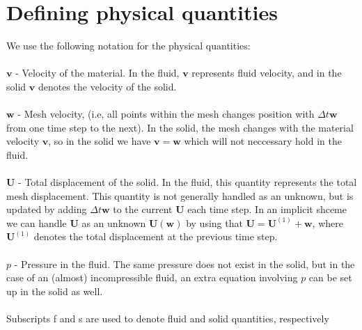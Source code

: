 \documentclass{article}
\begin{document}
\section{Defining physical quantities}
We use the following notation for the physical quantities: \\
\\
$\mathbf{v}$ - Velocity of the material. In the fluid, $\mathbf{v}$ represents fluid velocity, and in the solid $\mathbf{v}$ denotes the velocity of the solid. 
\\ \\
$\mathbf{w}$ - Mesh velocity, (i.e, all points within the mesh changes position with $\Delta t \mathbf{w}$ from one time step to the next). In the solid, the mesh changes with the material velocity $\mathbf{v}$, so in the solid we have $\mathbf{v} = \mathbf{w}$ which will not neccessary hold in the fluid.
\\
\\
$ \mathbf{U}$ - Total displacement of the solid. In the fluid, this quantity represents the total mesh displacement. This quantity is not generally handled as an unknown, but is updated by adding $\Delta t \mathbf{w}$ to the current $\mathbf{U}$ each time step. In an implicit shceme we can handle $\mathbf{U}$ as an unknown $\mathbf{U(w)}$ by using that $\mathbf{U} = \mathbf{U}^{(1)} + \mathbf{w}$, where $\mathbf{U}^{(1)}$ denotes the total displacement at the previous time step. 
\\
\\
$p$ - Pressure in the fluid. The same pressure does not exist in the solid, but in the case of an (almost) incompressible fluid, an extra equation involving $p$ can be set up in the solid as well. 
\\
\\
Subscripts f and s are used to denote fluid and solid quantities, respectively
\end{document}
